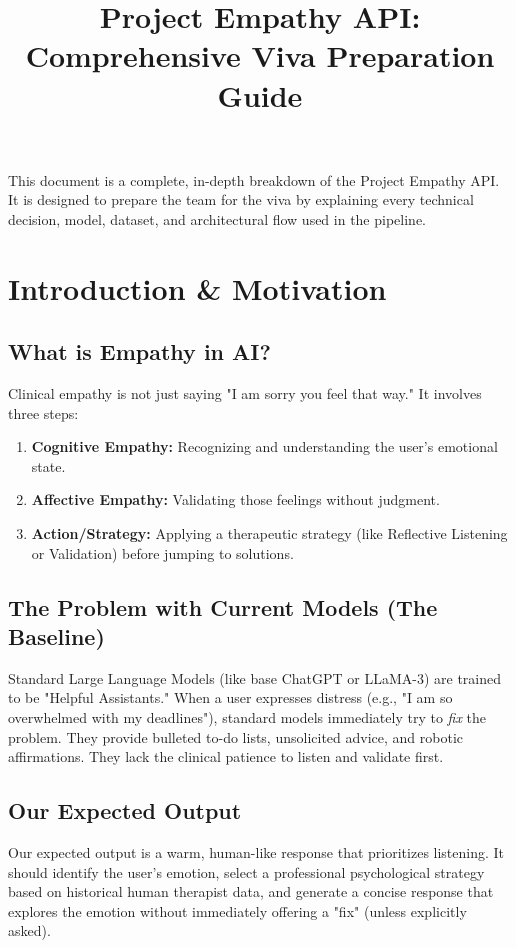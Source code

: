 \documentclass[12pt,a4paper]{article}
\title{\textbf{Project Empathy API: Comprehensive Viva Preparation Guide}}
\author{}
\date{}
\begin{document}
\maketitle

This document is a complete, in-depth breakdown of the Project Empathy API. It is designed to prepare the team for the viva by explaining every technical decision, model, dataset, and architectural flow used in the pipeline.

\section{Introduction \& Motivation}

\subsection{What is Empathy in AI?}
Clinical empathy is not just saying "I am sorry you feel that way." It involves three steps:
\begin{enumerate}
    \item \textbf{Cognitive Empathy:} Recognizing and understanding the user's emotional state.
    \item \textbf{Affective Empathy:} Validating those feelings without judgment.
    \item \textbf{Action/Strategy:} Applying a therapeutic strategy (like Reflective Listening or Validation) before jumping to solutions.
\end{enumerate}

\subsection{The Problem with Current Models (The Baseline)}
Standard Large Language Models (like base ChatGPT or LLaMA-3) are trained to be "Helpful Assistants." When a user expresses distress (e.g., "I am so overwhelmed with my deadlines"), standard models immediately try to \textit{fix} the problem. They provide bulleted to-do lists, unsolicited advice, and robotic affirmations. They lack the clinical patience to listen and validate first.

\subsection{Our Expected Output}
Our expected output is a warm, human-like response that prioritizes listening. It should identify the user's emotion, select a professional psychological strategy based on historical human therapist data, and generate a concise response that explores the emotion without immediately offering a "fix" (unless explicitly asked).
\end{document}
